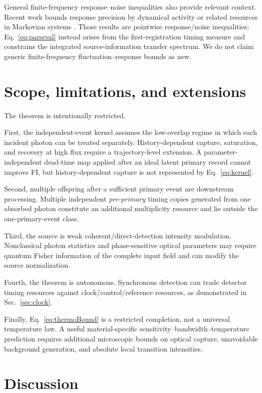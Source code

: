 \documentclass[aps,prapplied,preprint,nofootinbib]{revtex4-2}
\begin{document}
General finite-frequency response--noise inequalities also provide relevant context.  Recent work bounds response precision by dynamical activity or related resources in Markovian systems \cite{Dechant2026}.  Those results are pointwise response/noise inequalities; Eq.~\eqref{eq:parseval} instead arises from the first-registration timing measure and constrains the integrated source-information transfer spectrum.  We do not claim generic finite-frequency fluctuation--response bounds as new.

\section{Scope, limitations, and extensions}

The theorem is intentionally restricted.

First, the independent-event kernel assumes the low-overlap regime in which each incident photon can be treated separately.  History-dependent capture, saturation, and recovery at high flux require a trajectory-level extension.  A parameter-independent dead-time map applied after an ideal latent primary record cannot improve FI, but history-dependent capture is not represented by Eq.~\eqref{eq:kernel}.

Second, multiple offspring after a sufficient primary event are downstream processing.  Multiple independent \emph{pre-primary} timing copies generated from one absorbed photon constitute an additional multiplicity resource and lie outside the one-primary-event class.

Third, the source is weak coherent/direct-detection intensity modulation.  Nonclassical photon statistics and phase-sensitive optical parameters may require quantum Fisher information of the complete input field and can modify the source normalization.

Fourth, the theorem is autonomous.  Synchronous detection can trade detector timing resources against clock/control/reference resources, as demonstrated in Sec.~\ref{sec:clock}.

Finally, Eq.~\eqref{eq:thermoBound} is a restricted completion, not a universal temperature law.  A useful material-specific sensitivity--bandwidth--temperature prediction requires additional microscopic bounds on optical capture, unavoidable background generation, and absolute local transition intensities.

\section{Discussion}
\end{document}
